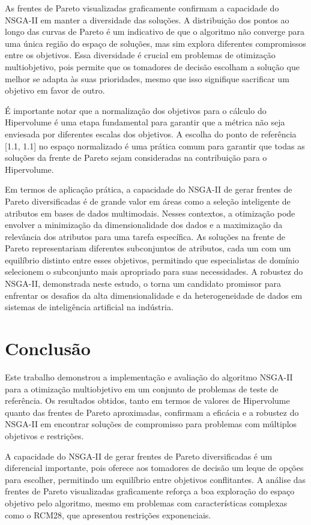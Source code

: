 \documentclass[12pt,openright,oneside,a4paper,english,brazil]{abntex2}
\begin{document}
As frentes de Pareto visualizadas graficamente confirmam a capacidade do NSGA-II em manter a diversidade das soluções. A distribuição dos pontos ao longo das curvas de Pareto é um indicativo de que o algoritmo não converge para uma única região do espaço de soluções, mas sim explora diferentes compromissos entre os objetivos. Essa diversidade é crucial em problemas de otimização multiobjetivo, pois permite que os tomadores de decisão escolham a solução que melhor se adapta às suas prioridades, mesmo que isso signifique sacrificar um objetivo em favor de outro.

É importante notar que a normalização dos objetivos para o cálculo do Hipervolume é uma etapa fundamental para garantir que a métrica não seja enviesada por diferentes escalas dos objetivos. A escolha do ponto de referência [1.1, 1.1] no espaço normalizado é uma prática comum para garantir que todas as soluções da frente de Pareto sejam consideradas na contribuição para o Hipervolume.

Em termos de aplicação prática, a capacidade do NSGA-II de gerar frentes de Pareto diversificadas é de grande valor em áreas como a seleção inteligente de atributos em bases de dados multimodais. Nesses contextos, a otimização pode envolver a minimização da dimensionalidade dos dados e a maximização da relevância dos atributos para uma tarefa específica. As soluções na frente de Pareto representariam diferentes subconjuntos de atributos, cada um com um equilíbrio distinto entre esses objetivos, permitindo que especialistas de domínio selecionem o subconjunto mais apropriado para suas necessidades. A robustez do NSGA-II, demonstrada neste estudo, o torna um candidato promissor para enfrentar os desafios da alta dimensionalidade e da heterogeneidade de dados em sistemas de inteligência artificial na indústria.


\chapter{Conclusão}
Este trabalho demonstrou a implementação e avaliação do algoritmo NSGA-II para a otimização multiobjetivo em um conjunto de problemas de teste de referência. Os resultados obtidos, tanto em termos de valores de Hipervolume quanto das frentes de Pareto aproximadas, confirmam a eficácia e a robustez do NSGA-II em encontrar soluções de compromisso para problemas com múltiplos objetivos e restrições.

A capacidade do NSGA-II de gerar frentes de Pareto diversificadas é um diferencial importante, pois oferece aos tomadores de decisão um leque de opções para escolher, permitindo um equilíbrio entre objetivos conflitantes. A análise das frentes de Pareto visualizadas graficamente reforça a boa exploração do espaço objetivo pelo algoritmo, mesmo em problemas com características complexas como o RCM28, que apresentou restrições exponenciais.
\end{document}
